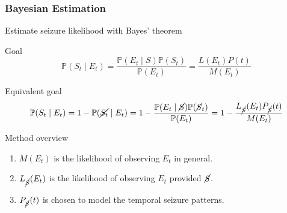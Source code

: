 \documentclass[t]{beamer}
\theoremstyle{definition}
\def\baselineskip{}%
\begin{document}
\subsubsection{Bayesian Estimation}
\begin{frame}{Estimate seizure likelihood with Bayes' theorem}
    
    \begin{alertblock}{Goal}
        $$\mathbb{P}(S_t \mid E_t) = \frac{\mathbb{P}(E_t \mid S) \mathbb{P}(S_t)}{\mathbb{P}(E_t)} = \frac{L(E_t)P(t)}{M(E_t)}$$
    \end{alertblock}

    \pause
    \begin{block}{Equivalent goal}
        \vspace{-\baselineskip}
        $$\mathbb{P}(S_t \mid E_t) = 1 - \mathbb{P}(\cancel{S_t} \mid E_t) = 1 - \frac{\mathbb{P}(E_t \mid \cancel{S}) \mathbb{P}(\cancel{S}_t)}{\mathbb{P}(E_t)} = 1 - \frac{L_{\cancel{S}}(E_t)P_{\cancel{S}}(t)}{M(E_t)}$$
    \end{block}

    \pause
    \begin{block}{Method overview}
        \begin{enumerate}[<+->]
            \item $M(E_t)$ is the likelihood of observing $E_t$ in general.
            \item $L_{\cancel{S}}(E_t)$ is the likelihood of observing $E_t$ provided $\cancel{S}$.
            \item $P_{\cancel{S}}(t)$ is chosen to model the temporal seizure patterns.
        \end{enumerate}
    \end{block}

\end{frame}
\end{document}

